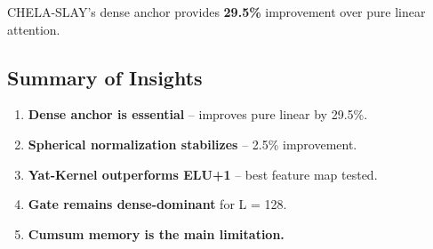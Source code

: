 CHELA-SLAY's dense anchor provides \textbf{29.5\%} improvement over 
pure linear attention.

\subsection{Summary of Insights}

\begin{enumerate}
\item \textbf{Dense anchor is essential} -- improves pure linear by 29.5\%.
\item \textbf{Spherical normalization stabilizes} -- 2.5\% improvement.
\item \textbf{Yat-Kernel outperforms ELU+1} -- best feature map tested.
\item \textbf{Gate remains dense-dominant} for L = 128.
\item \textbf{Cumsum memory is the main limitation.}

\end{enumerate}
